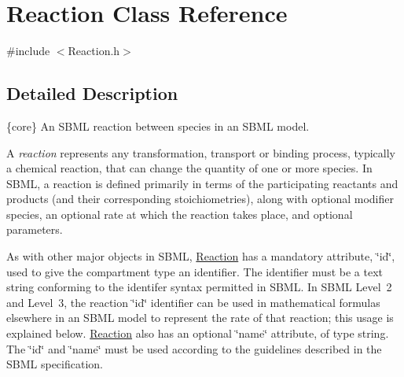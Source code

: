 \hypertarget{class_reaction}{}\section{Reaction Class Reference}
\label{class_reaction}


{\ttfamily \#include $<$Reaction.\+h$>$}



\subsection{Detailed Description}
\{core\} An S\+B\+ML reaction between species in an S\+B\+ML model.

A {\itshape reaction} represents any transformation, transport or binding process, typically a chemical reaction, that can change the quantity of one or more species. In S\+B\+ML, a reaction is defined primarily in terms of the participating reactants and products (and their corresponding stoichiometries), along with optional modifier species, an optional rate at which the reaction takes place, and optional parameters.

As with other major objects in S\+B\+ML, \hyperlink{class_reaction}{Reaction} has a mandatory attribute, \char`\"{}id\char`\"{}, used to give the compartment type an identifier. The identifier must be a text string conforming to the identifer syntax permitted in S\+B\+ML. In S\+B\+ML Level~2 and Level~3, the reaction \char`\"{}id\char`\"{} identifier can be used in mathematical formulas elsewhere in an S\+B\+ML model to represent the rate of that reaction; this usage is explained below. \hyperlink{class_reaction}{Reaction} also has an optional \char`\"{}name\char`\"{} attribute, of type {\ttfamily string}. The \char`\"{}id\char`\"{} and \char`\"{}name\char`\"{} must be used according to the guidelines described in the S\+B\+ML specification.

